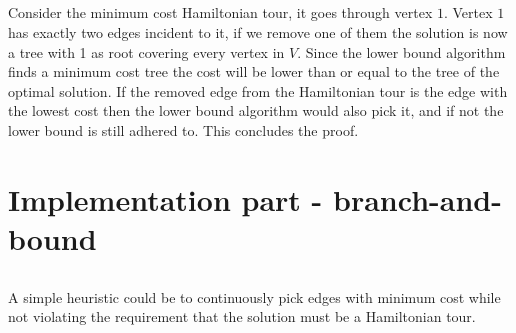 \subsection{}
Consider the minimum cost Hamiltonian tour, it goes through vertex $1$. Vertex $1$ has exactly two edges incident to it, if we remove one of them the solution is now a tree with 1 as root covering every vertex in $V$. Since the lower bound algorithm finds a minimum cost tree the cost will be lower than or equal to the tree of the optimal solution. If the removed edge from the Hamiltonian tour is the edge with the lowest cost then the lower bound algorithm would also pick it, and if not the lower bound is still adhered to. This concludes the proof.

\section{Implementation part - branch-and-bound}
\subsection{}
A simple heuristic could be to continuously pick edges with minimum cost while not violating the requirement that the solution must be a Hamiltonian tour.

\subsection{}

\subsection{}